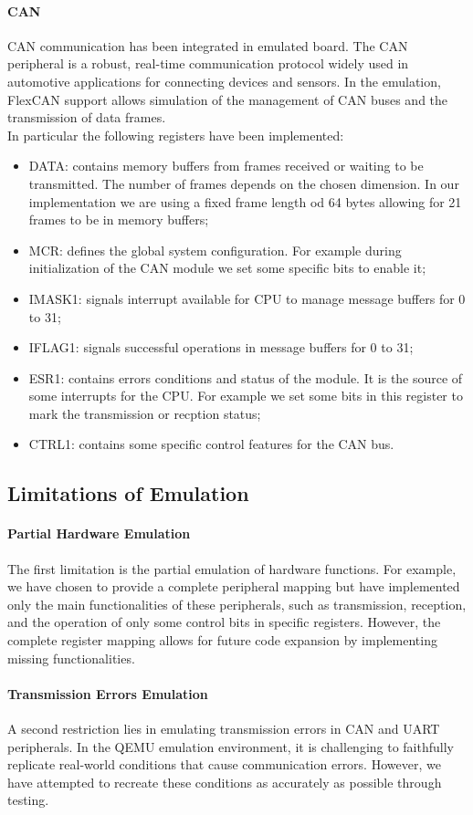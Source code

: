 \paragraph{CAN}
CAN communication has been integrated in emulated board. The CAN peripheral is a robust, real-time communication protocol widely used in automotive applications for connecting devices and sensors. In the emulation, FlexCAN support allows simulation of the management of CAN buses and the transmission of data frames.\\
In particular the following registers have been implemented:
\begin{itemize}
    \item DATA: contains memory buffers from frames received or waiting to be transmitted. The number of frames depends on the chosen dimension. In our implementation we are using a fixed frame length od 64 bytes allowing for 21 frames to be in memory buffers;
    \item MCR: defines the global system configuration. For example during initialization of the CAN module we set some specific bits to enable it;
    \item IMASK1: signals interrupt available for CPU to manage message buffers for 0 to 31;
    \item IFLAG1: signals successful operations in message buffers for 0 to 31;
    \item ESR1: contains errors conditions and status of the module. It is the source of some interrupts for the CPU. For example we set some bits in this register to mark the transmission or recption status;
    \item CTRL1: contains some specific control features for the CAN bus.
\end{itemize}


\subsection{Limitations of Emulation}

\paragraph{Partial Hardware Emulation}
The first limitation is the partial emulation of hardware functions. For example, we have chosen to provide a complete peripheral mapping but have implemented only the main functionalities of these peripherals, such as transmission, reception, and the operation of only some control bits in specific registers. However, the complete register mapping allows for future code expansion by implementing missing functionalities.

\paragraph{Transmission Errors Emulation}
A second restriction lies in emulating transmission errors in CAN and UART peripherals. In the QEMU emulation environment, it is challenging to faithfully replicate real-world conditions that cause communication errors. However, we have attempted to recreate these conditions as accurately as possible through testing.

